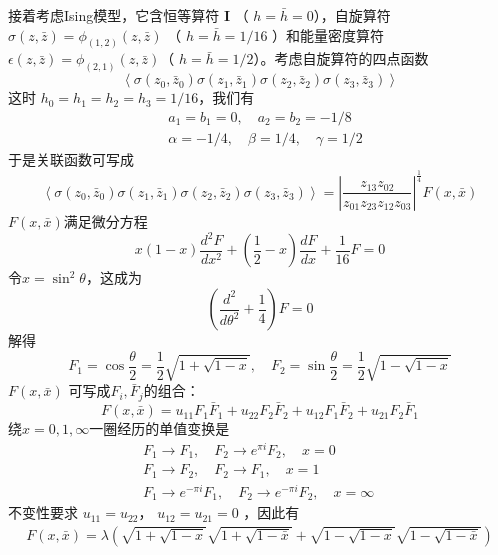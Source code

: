 接着考虑Ising模型，它含恒等算符 $\boldsymbol{I}$ （ $h=\bar{h}=0 $），自旋算符$ \sigma(z, \bar{z})=\phi_{(1,2)}(z, \bar{z})$ （ $h=\bar{h}=1/16$ ）和能量密度算符 $\epsilon(z, \bar{z})=\phi_{(2,1)}(z, \bar{z}) $（ $h=\bar{h}=1/2 $）。考虑自旋算符的四点函数
$$
\left\langle\sigma\left(z_{0}, \bar{z}_{0}\right) \sigma\left(z_{1}, \bar{z}_{1}\right) \sigma\left(z_{2}, \bar{z}_{2}\right) \sigma\left(z_{3}, \bar{z}_{3}\right)\right\rangle
$$
这时 $h_{0}=h_{1}=h_{2}=h_{3} =1/16 $，我们有
\begin{equation}
	\begin{aligned} &a_{1}=b_{1}=0, \quad a_{2}=b_{2}=-1/8 \\ &\alpha=-1/4,\quad \beta=1/4,\quad \gamma=1/2
	 \end{aligned}
\end{equation}
于是关联函数可写成
\begin{equation}
	\left\langle\sigma\left(z_{0}, \bar{z}_{0}\right) \sigma\left(z_{1}, \bar{z}_{1}\right) \sigma\left(z_{2}, \bar{z}_{2}\right) \sigma\left(z_{3}, \bar{z}_{3}\right)\right\rangle=\left|\frac{z_{13} z_{02}}{z_{01} z_{23} z_{12} z_{03}}\right|^{\frac{1}{4}} F(x, \bar{x})
\end{equation}
$F(x, \bar{x}) $满足微分方程
\begin{equation}
	x(1-x) \frac{d^{2} F}{d x^{2}}+\left(\frac{1}{2}-x\right) \frac{d F}{d x}+\frac{1}{16} F=0
\end{equation}
令$ x=\sin^2\theta $，这成为
$$
\left(\frac{d^{2}}{d \theta^{2}}+\frac{1}{4}\right) F=0
$$
解得
\begin{equation}
	F_{1}=\cos \frac{\theta}{2}=\frac{1}{2} \sqrt{1+\sqrt{1-x}}, \quad F_{2}=\sin \frac{\theta}{2}=\frac{1}{2} \sqrt{1-\sqrt{1-x}}
\end{equation}
$F(x, \bar{x})$ 可写成$ F_i,\bar{F}_j $的组合：
\begin{equation}
	F(x, \bar{x})=u_{11} F_{1} \bar{F}_{1}+u_{22} F_{2} \bar{F}_{2}+u_{12} F_{1} \bar{F}_{2}+u_{21} F_{2} \bar{F}_{1}
\end{equation} 
绕$ x=0,1,\infty $一圈经历的单值变换是
\begin{align} &F_{1} \rightarrow F_{1}, \quad F_{2} \rightarrow e^{\pi i} F_{2}, \quad x=0\quad \\ &F_{1} \rightarrow F_{2}, \quad F_{2} \rightarrow F_{1}, \quad x=1\quad\\ &F_{1} \rightarrow e^{-\pi i} F_{1}, \quad F_{2} \rightarrow e^{-\pi i} F_{2}, \quad x=\infty\quad  \end{align}
不变性要求 $u_{11}=u_{22} $， $u_{12}=u_{21}=0$ ，因此有
\begin{equation}
	\begin{aligned} F(x, \bar{x})=\lambda\left( \sqrt{1+\sqrt{1-x}} \sqrt{1+\sqrt{1-\bar{x}}}+\sqrt{1-\sqrt{1-x}} \sqrt{1-\sqrt{1-\bar{x}}}\right) \end{aligned}
\end{equation}

